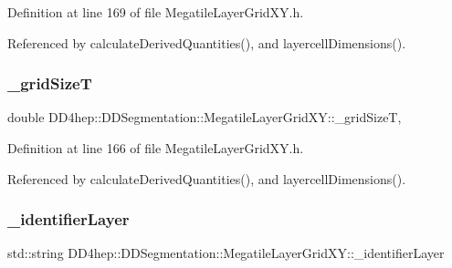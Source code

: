 Definition at line 169 of file Megatile\+Layer\+Grid\+X\+Y.\+h.



Referenced by calculate\+Derived\+Quantities(), and layercell\+Dimensions().

\hypertarget{class_d_d4hep_1_1_d_d_segmentation_1_1_megatile_layer_grid_x_y_a73e8bf85c016511dedb6a892ef543163}{}\label{class_d_d4hep_1_1_d_d_segmentation_1_1_megatile_layer_grid_x_y_a73e8bf85c016511dedb6a892ef543163} 
\subsubsection{\texorpdfstring{\+\_\+grid\+SizeT}{\_gridSizeT}}
{\footnotesize\ttfamily double D\+D4hep\+::\+D\+D\+Segmentation\+::\+Megatile\+Layer\+Grid\+X\+Y\+::\+\_\+grid\+SizeT\hspace{0.3cm}{\ttfamily [mutable]}, {\ttfamily [protected]}}



Definition at line 166 of file Megatile\+Layer\+Grid\+X\+Y.\+h.



Referenced by calculate\+Derived\+Quantities(), and layercell\+Dimensions().

\hypertarget{class_d_d4hep_1_1_d_d_segmentation_1_1_megatile_layer_grid_x_y_a9bd28cb051873b31327867a7636774e4}{}\label{class_d_d4hep_1_1_d_d_segmentation_1_1_megatile_layer_grid_x_y_a9bd28cb051873b31327867a7636774e4} 
\subsubsection{\texorpdfstring{\+\_\+identifier\+Layer}{\_identifierLayer}}
{\footnotesize\ttfamily std\+::string D\+D4hep\+::\+D\+D\+Segmentation\+::\+Megatile\+Layer\+Grid\+X\+Y\+::\+\_\+identifier\+Layer\hspace{0.3cm}{\ttfamily [protected]}}



